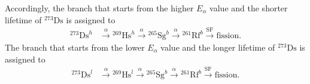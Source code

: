 \documentclass[final,5p,times,twocolumn,number,sort&compress]{elsarticle}
\begin{document}
Accordingly, the branch that starts from the higher $E_{\alpha}$ value and the shorter lifetime of $^{273}\mathrm{Ds}$ is assigned to
\begin{align*}
^{273}\text{Ds}^{h} &\xrightarrow{\alpha} {}^{269}\text{Hs}^{h} \xrightarrow{\alpha} {}^{265}\text{Sg}^{b} \xrightarrow{\alpha} {}^{261}\text{Rf}^{b} \xrightarrow{\text{SF}} \text{fission} .
\end{align*}
The branch that starts from the lower $E_{\alpha}$ value and the longer lifetime of $^{273}\mathrm{Ds}$ is assigned to
\begin{align*}
^{273}\text{Ds}^{l} &\xrightarrow{\alpha} {}^{269}\text{Hs}^{l} \xrightarrow{\alpha} {}^{265}\text{Sg}^{b} \xrightarrow{\alpha} {}^{261}\text{Rf}^{b} \xrightarrow{\text{SF}} \text{fission} .
\end{align*}
\end{document}
